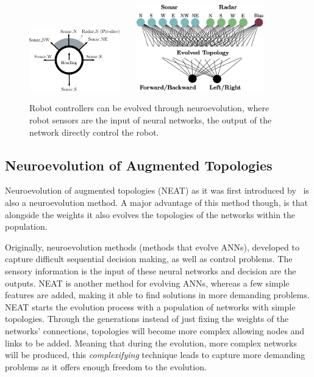 \begin{figure}[t!]
\centering
\includegraphics[width=0.35\textwidth]{../Figures/Misc/RobotMaze.eps}\  \    \  \    
\includegraphics[width=0.49\textwidth]{../Figures/Misc/RobotMazeNetwork.eps}
\caption{Robot controllers can be evolved through neuroevolution, where robot sensors are the input of neural networks, the output of the network directly control the robot.}
\label{fig:robotExample}
\end{figure}


\subsection{Neuroevolution of Augmented Topologies}

Neuroevolution of augmented topologies (NEAT) as it was first introduced by~\citep{stanley2002evolving} is also a neuroevolution method. A major advantage of this method though, is that alongside the weights it also evolves the topologies of the networks within the population.

Originally, neuroevolution methods (methods that evolve ANNs), developed to capture difficult sequential decision making, as well as control problems. The sensory information is the input of these neural networks and decision are the outputs. NEAT is another method for evolving ANNs, whereas a few simple features are added, making it able to find solutions in more demanding problems. NEAT starts the evolution process with a population of networks with simple topologies. Through the generations instead of just fixing the weights of the networks' connections, topologies will become more complex allowing nodes and links to be added. Meaning that during the evolution, more complex networks will be produced, this \emph{complexifying} technique leads to capture more demanding problems as it offers enough freedom to the evolution.

